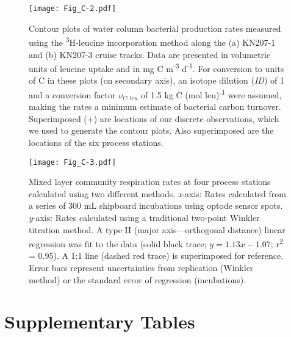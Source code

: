 \clearpage

\begin{figure}[!th]
\centering
\texttt{[image: Fig\_C-2.pdf]}
\caption[Contour plots of water column bacterial production rates along the KN207-1 and KN207-3 cruise tracks]{Contour plots of water column bacterial production rates measured using the \textsuperscript{3}H-leucine incorporation method along the (a) KN207-1 and (b) KN207-3 cruise tracks. Data are presented in volumetric units of leucine uptake and in mg C m\textsuperscript{-3} d\textsuperscript{-1}. For conversion to units of C in these plots (on secondary axis), an isotope dilution (\emph{ID}) of 1 and a conversion factor ${\nu _{C:leu}}$ of 1.5 kg C (mol leu)\textsuperscript{-1} were assumed, making the rates a minimum estimate of bacterial carbon turnover. Superimposed (+) are locations of our discrete observations, which we used to generate the contour plots. Also superimposed are the locations of the six process stations.
}
\label{fig:acn2}
\end{figure}

\clearpage

\begin{figure}[!th]
\centering
\texttt{[image: Fig\_C-3.pdf]}
\caption[Mixed layer community respiration rates at four process stations calculated using two different methods]{Mixed layer community respiration rates at four process stations calculated using two different methods. \emph{x}-axis: Rates calculated from a series of 300 mL shipboard incubations using optode sensor spots. \emph{y}-axis: Rates calculated using a traditional two-point Winkler titration method. A type II (major axis---orthogonal distance) linear regression was fit to the data (solid black trace; $y = 1.13x - 1.07$; r\textsuperscript{2} = 0.95). A 1:1 line (dashed red trace) is superimposed for reference. Error bars represent uncertainties from replication (Winkler method) or the standard error of regression (incubations).
}
\label{fig:acn3}
\end{figure}

\clearpage

\section{Supplementary Tables}

\clearpage

